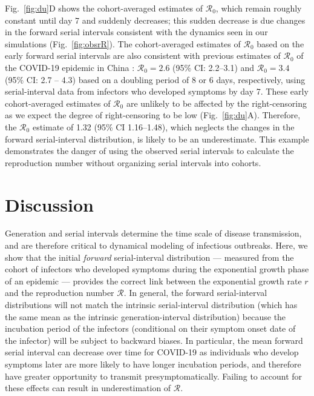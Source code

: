 \documentclass[12pt]{article}
\newcommand{\fref}[1]{Fig.~\ref{fig:#1}}
\newcommand{\Rx}[1]{\ensuremath{{\mathcal R}_{#1}}\xspace}
\newcommand{\Ro}{\Rx{0}}
\newcommand{\RR}{\ensuremath{{\mathcal R}}\xspace}
\begin{document}
\fref{du}D shows the cohort-averaged estimates of \Ro, which remain roughly constant until day 7 and suddenly decreases;
this sudden decrease is due changes in the forward serial intervals consistent with the dynamics seen in our simulations (\fref{obsrR}).
The cohort-averaged estimates of \Ro based on the early forward serial intervals are also consistent with previous estimates of \Ro of the COVID-19 epidemic in China \citep{majumder2020early, doi:10.1098/rsif.2020.0144}:
$\Ro = 2.6$ (95\% CI: 2.2--3.1) and $\Ro = 3.4$ (95\% CI: 2.7 -- 4.3) based on a doubling period of 8 or 6 days, respectively, using serial-interval data from infectors who developed symptoms by day 7.
These early cohort-averaged estimates of \Ro are unlikely to be affected by the right-censoring as we expect the degree of right-censoring to be low (\fref{du}A).
Therefore, the \Ro estimate of 1.32 (95\% CI 1.16–1.48), which neglects the changes in the forward serial-interval distribution, is likely to be an underestimate.
This example demonstrates the danger of using the observed serial intervals to calculate the reproduction number without organizing serial intervals into cohorts.

\section{Discussion}

Generation and serial intervals determine the time scale of disease transmission, and are therefore critical to dynamical modeling of infectious outbreaks.
Here, we show that the initial \emph{forward} serial-interval distribution --- measured from the cohort of infectors who developed symptoms during the exponential growth phase of an epidemic --- provides the correct link between the exponential growth rate $r$ and the reproduction number \RR.
In general, the forward serial-interval distributions will not match the intrinsic serial-interval distribution (which has the same mean as the intrinsic generation-interval distribution) because the incubation period of the infectors (conditional on their symptom onset date of the infector) will be subject to backward biases.
In particular, the mean forward serial interval can decrease over time for COVID-19 as individuals who develop symptoms later are more likely to have longer incubation periods, and therefore have greater opportunity to transmit presymptomatically.
Failing to account for these effects can result in underestimation of \RR.
\end{document}
